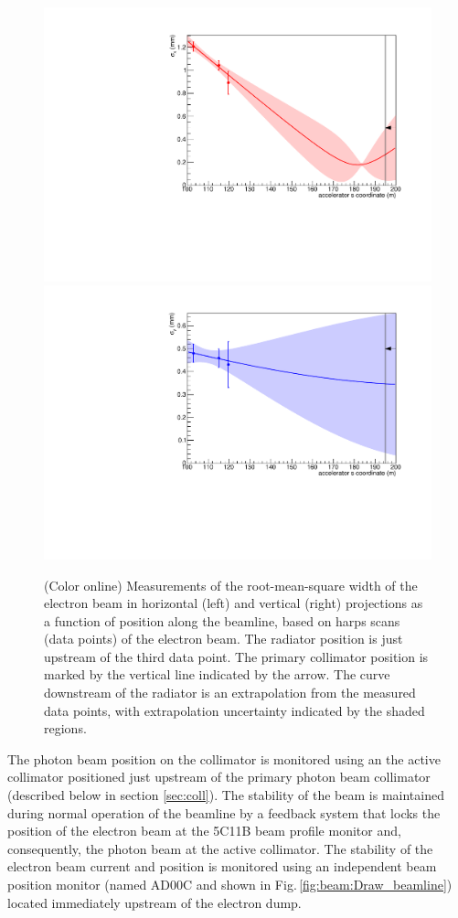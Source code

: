 \begin{figure}[tbp]
\begin{center}
 \includegraphics[clip=true,width=0.49\linewidth]{figures/harp-x-767755.pdf}
 \includegraphics[clip=true,width=0.49\linewidth]{figures/harp-y-767755.pdf}
\end{center}
\caption{(Color online) Measurements of the root-mean-square width of the electron beam 
in horizontal (left)
and vertical (right) projections as a function of position along the beamline, based on
harps scans (data points) of the electron beam. The radiator position is just upstream
of the third data point. The primary collimator position is marked by the vertical line
indicated by the arrow. The curve downstream of the radiator is an extrapolation from
the measured data points, with extrapolation uncertainty indicated by the shaded regions.
        }
\label{fig:beam:convergence} 
\end{figure}

The photon beam position on the collimator is monitored using an
the active collimator positioned just upstream of the primary photon beam collimator
(described below in section \ref{sec:coll}). 
The stability of the beam is maintained during normal
operation of the beamline by a feedback system that locks the position of the electron
beam at the 5C11B beam profile monitor and, consequently, the photon beam at the active collimator. The stability of the electron
beam current and position is monitored using an independent beam position monitor
(named AD00C and shown in Fig.\,\ref{fig:beam:Draw_beamline}) 
located immediately upstream of the electron dump.

